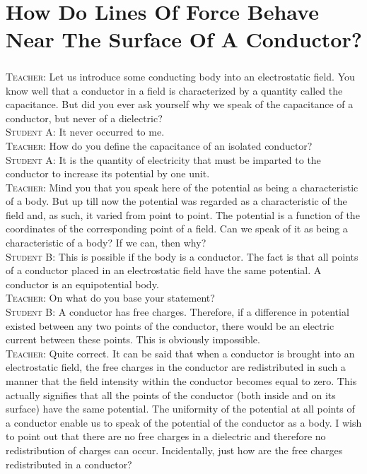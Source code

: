 \documentclass[a4paper,sfsidenotes]{tufte-book}
\begin{document}
\chapter{How Do Lines Of Force Behave Near The Surface Of A Conductor?}
\label{ch-24}

\paragraph{}
\textsc{Teacher:} Let us introduce some conducting body into an electrostatic field. You know well that a conductor in a field is characterized by a quantity called the capacitance. But did you ever ask yourself why we speak of the capacitance of a conductor, but never of a dielectric?
\\
\textsc{Student A:} It never occurred to me.
\\
\textsc{Teacher:} How do you define the capacitance of an isolated conductor?
\\
\textsc{Student A:} It is the quantity of electricity that must be imparted to the conductor to increase its potential by one unit.
\\
\textsc{Teacher:} Mind you that you speak here of the potential as being a characteristic of a body. But up till now the potential was regarded as a characteristic of the field and, as such, it varied from point to point. The potential is a function of the coordinates of the corresponding point of a field. Can we speak of it as being a characteristic of a body? If we can, then why?
\\
\textsc{Student B:} This is possible if the body is a conductor. The fact is that all points of a conductor placed in an electrostatic field have the same potential. A conductor is an equipotential body.
\\
\textsc{Teacher:} On what do you base your statement?
\\
\textsc{Student B:} A conductor has free charges. Therefore, if a difference in potential existed between any two points of the conductor, there would be an electric current between these points. This is obviously impossible.
\\
\textsc{Teacher:} Quite correct. It can be said that when a conductor is brought into an electrostatic field, the free charges in the conductor are redistributed in such a manner that the field intensity within the conductor becomes equal to zero. This actually signifies that all the points of the conductor (both inside and on its surface) have the same potential. The uniformity of the potential at all points of a conductor enable us to speak of the potential of the conductor as a body. I wish to point out that there are no free charges in a dielectric and therefore no redistribution of charges can occur. Incidentally, just how are the free charges redistributed in a conductor?
\end{document}
